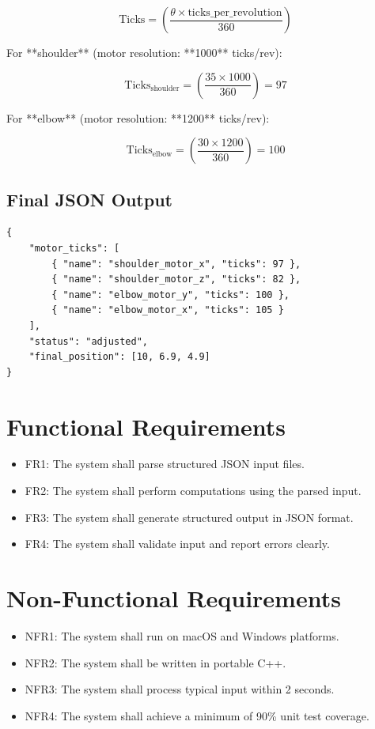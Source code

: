 \documentclass{article}
\begin{document}
\[
\mathrm{Ticks} = \left(\frac{\theta \times \text{ticks\_per\_revolution}}{360} \right)
\]



For **shoulder** (motor resolution: **1000** ticks/rev):



\[
\mathrm{Ticks}_{\text{shoulder}} = \left(\frac{35 \times 1000}{360} \right) = 97
\]



For **elbow** (motor resolution: **1200** ticks/rev):



\[
\mathrm{Ticks}_{\text{elbow}} = \left(\frac{30 \times 1200}{360} \right) = 100
\]



\subsection{Final JSON Output}
\begin{verbatim}
{
    "motor_ticks": [
        { "name": "shoulder_motor_x", "ticks": 97 },
        { "name": "shoulder_motor_z", "ticks": 82 },
        { "name": "elbow_motor_y", "ticks": 100 },
        { "name": "elbow_motor_x", "ticks": 105 }
    ],
    "status": "adjusted",
    "final_position": [10, 6.9, 4.9]
}
\end{verbatim}



\section{Functional Requirements}
\begin{itemize}
  \item FR1: The system shall parse structured JSON input files.
  \item FR2: The system shall perform computations using the parsed input.
  \item FR3: The system shall generate structured output in JSON format.
  \item FR4: The system shall validate input and report errors clearly.
\end{itemize}

\section{Non-Functional Requirements}
\begin{itemize}
  \item NFR1: The system shall run on macOS and Windows platforms.
  \item NFR2: The system shall be written in portable C++.
  \item NFR3: The system shall process typical input within 2 seconds.
  \item NFR4: The system shall achieve a minimum of 90\% unit test coverage.
\end{itemize}
\end{document}
